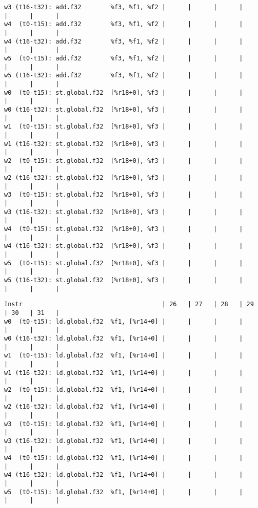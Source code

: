 \documentclass[11pt]{article}
\begin{document}
\begin{Answer}
\begin{verbatim}
w3 (t16-t32): add.f32        %f3, %f1, %f2 |      |      |      |      |      |      |
w4  (t0-t15): add.f32        %f3, %f1, %f2 |      |      |      |      |      |      |
w4 (t16-t32): add.f32        %f3, %f1, %f2 |      |      |      |      |      |      |
w5  (t0-t15): add.f32        %f3, %f1, %f2 |      |      |      |      |      |      |
w5 (t16-t32): add.f32        %f3, %f1, %f2 |      |      |      |      |      |      |
w0  (t0-t15): st.global.f32  [%r18+0], %f3 |      |      |      |      |      |      |
w0 (t16-t32): st.global.f32  [%r18+0], %f3 |      |      |      |      |      |      |
w1  (t0-t15): st.global.f32  [%r18+0], %f3 |      |      |      |      |      |      |
w1 (t16-t32): st.global.f32  [%r18+0], %f3 |      |      |      |      |      |      |
w2  (t0-t15): st.global.f32  [%r18+0], %f3 |      |      |      |      |      |      |
w2 (t16-t32): st.global.f32  [%r18+0], %f3 |      |      |      |      |      |      |
w3  (t0-t15): st.global.f32  [%r18+0], %f3 |      |      |      |      |      |      |
w3 (t16-t32): st.global.f32  [%r18+0], %f3 |      |      |      |      |      |      |
w4  (t0-t15): st.global.f32  [%r18+0], %f3 |      |      |      |      |      |      |
w4 (t16-t32): st.global.f32  [%r18+0], %f3 |      |      |      |      |      |      |
w5  (t0-t15): st.global.f32  [%r18+0], %f3 |      |      |      |      |      |      |
w5 (t16-t32): st.global.f32  [%r18+0], %f3 |      |      |      |      |      |      |
\end{verbatim}
\newpage
\begin{verbatim}
Instr                                      | 26   | 27   | 28   | 29   | 30   | 31   |
w0  (t0-t15): ld.global.f32  %f1, [%r14+0] |      |      |      |      |      |      |
w0 (t16-t32): ld.global.f32  %f1, [%r14+0] |      |      |      |      |      |      |
w1  (t0-t15): ld.global.f32  %f1, [%r14+0] |      |      |      |      |      |      |
w1 (t16-t32): ld.global.f32  %f1, [%r14+0] |      |      |      |      |      |      |
w2  (t0-t15): ld.global.f32  %f1, [%r14+0] |      |      |      |      |      |      |
w2 (t16-t32): ld.global.f32  %f1, [%r14+0] |      |      |      |      |      |      |
w3  (t0-t15): ld.global.f32  %f1, [%r14+0] |      |      |      |      |      |      |
w3 (t16-t32): ld.global.f32  %f1, [%r14+0] |      |      |      |      |      |      |
w4  (t0-t15): ld.global.f32  %f1, [%r14+0] |      |      |      |      |      |      |
w4 (t16-t32): ld.global.f32  %f1, [%r14+0] |      |      |      |      |      |      |
w5  (t0-t15): ld.global.f32  %f1, [%r14+0] |      |      |      |      |      |      |

\end{verbatim}
\end{Answer}
\end{document}
